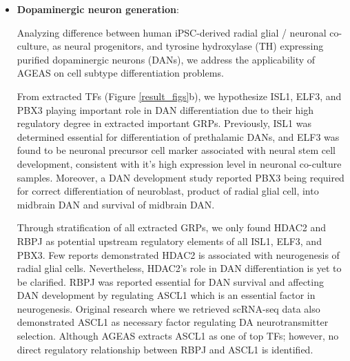 \documentclass[fleqn,10pt]{wlscirep}
\begin{document}
  \begin{itemize}
      \setlength\itemsep{0em}
      \item {\textbf{Dopaminergic neuron generation}}:

        Analyzing difference between human iPSC-derived radial glial / neuronal co-culture, as neural progenitors,\cite{ASCL1_dopaminergic_neuron_2021} and tyrosine hydroxylase (TH) expressing purified dopaminergic neurons (DANs), we address the applicability of AGEAS on cell subtype differentiation problems.

        From extracted TFs (Figure \ref{result_figs}b), we hypothesize ISL1, ELF3, and PBX3 playing important role in DAN differentiation due to their high regulatory degree in extracted important GRPs.
        Previously, ISL1 was determined essential for differentiation of prethalamic DANs, \cite{isl1_da} and ELF3 was found to be neuronal precursor cell marker associated with neural stem cell development, \cite{ELF3_precursor_marker} consistent with it's high expression level in neuronal co-culture samples.
        Moreover, a DAN development study reported PBX3 being required for correct differentiation of neuroblast, product of radial glial cell, into midbrain DAN and survival of midbrain DAN. \cite{pbx3_dan}

        Through stratification of all extracted GRPs, we only found HDAC2 and RBPJ as potential upstream regulatory elements of all ISL1, ELF3, and PBX3.
        Few reports demonstrated HDAC2 is associated with neurogenesis of radial glial cells. \cite{hdac2_dan_1, hdac2_dan_2}
        Nevertheless, HDAC2's role in DAN differentiation is yet to be clarified.
        RBPJ was reported essential for DAN survival and affecting DAN development by regulating ASCL1 which is an essential factor in neurogenesis. \cite{rbpj_1, rbpj_2}
        Original research where we retrieved scRNA-seq data also demonstrated ASCL1 as necessary factor regulating DA neurotransmitter selection. \cite{ASCL1_dopaminergic_neuron_2021}
        Although AGEAS extracts ASCL1 as one of top TFs; however, no direct regulatory relationship between RBPJ and ASCL1 is identified.


\end{itemize}
\end{document}

